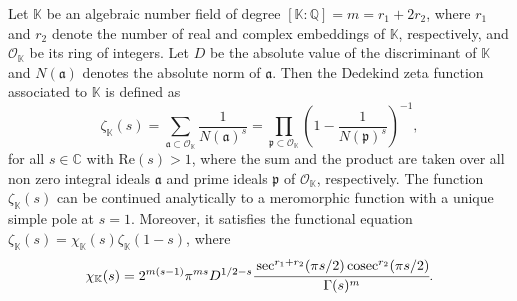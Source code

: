 \documentclass[reqno]{amsart}
\newcommand{\cosec}{\text{cosec}}
\numberwithin{equation}{section}
\theoremstyle{plain}
\begin{document}
	
	
	Let $\mathbb{K}$ be an algebraic number field of degree $[\mathbb{K}: \mathbb{Q}] =m=r_1+2r_2$, where $r_1$ and $r_2$ denote the number of real and complex embeddings of $\mathbb{K}$, respectively, and $\mathcal{O}_{\mathbb{K}}$ be its ring of integers. Let $D$ be the absolute value of the discriminant of $\mathbb{K}$ and $N(\mathfrak{a})$ denotes the absolute norm of $\mathfrak{a}$. Then the Dedekind zeta function associated to $\mathbb{K}$ is defined as 
	\begin{equation*}
		\zeta_{\mathbb{K}}(s)= \sum_{\mathfrak{a}\subset \mathcal{O}_{\mathbb{K}}} \frac{1}{N(\mathfrak{a})^s} = \prod_{\mathfrak{p}\subset \mathcal{O}_{\mathbb{K}}} \left(1-\frac{1}{N(\mathfrak{p})^s}\right)^{-1} ,
	\end{equation*} 
for all $s\in \mathbb{C}$ with $\text{Re}(s)>1$, 
	where the sum and the product are taken over all non zero integral ideals $\mathfrak{a}$ and prime ideals $\mathfrak{p}$ of  $\mathcal{O}_{\mathbb{K}}$, respectively. The function $\zeta_{\mathbb{K}}(s)$ can be continued analytically to a meromorphic function with a unique simple pole at $s=1$. Moreover, it satisfies the functional equation $\zeta_{\mathbb{K}}(s)= \chi_{\mathbb{K}}(s) \zeta_{\mathbb{K}}(1-s)$, where
	\begin{equation} \label{chi_K(s)}
		\chi_{\mathbb{K}}(s) = 2^{m(s-1)} \pi^{ms} D^{1/2-s} \cfrac{\sec^{r_1+r_2}(\pi s/2)\,\cosec^{r_2}(\pi s/2)}{\Gamma(s)^m}.
	\end{equation}
\end{document}
